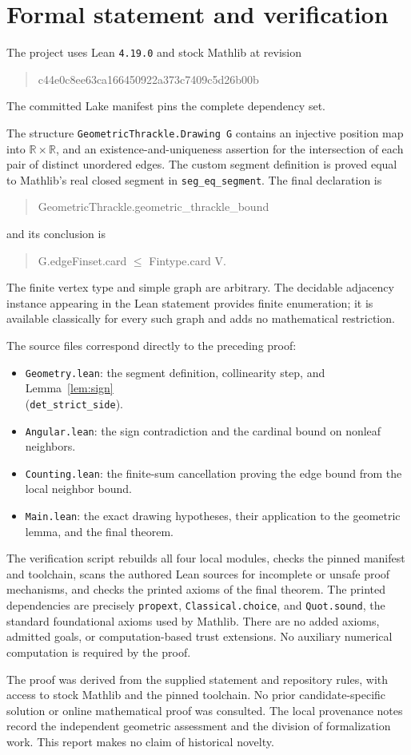 \documentclass[11pt]{article}
\begin{document}
\section{Formal statement and verification}
The project uses Lean \texttt{4.19.0} and stock Mathlib at revision
\begin{quote}\small\ttfamily
c44e0c8ee63ca166450922a373c7409c5d26b00b
\end{quote}
The committed Lake manifest pins the complete dependency set.

The structure \texttt{GeometricThrackle.Drawing G} contains an injective
position map into $\mathbb R\times\mathbb R$, and an existence-and-uniqueness
assertion for the intersection of each pair of distinct unordered edges.
The custom segment definition is proved equal to Mathlib's real closed
segment in \texttt{seg\_eq\_segment}. The final declaration is
\begin{quote}\ttfamily\small
GeometricThrackle.geometric\_thrackle\_bound
\end{quote}
and its conclusion is
\begin{quote}\ttfamily\small
G.edgeFinset.card $\leq$ Fintype.card V.
\end{quote}
The finite vertex type and simple graph are arbitrary. The decidable
adjacency instance appearing in the Lean statement provides finite
enumeration; it is available classically for every such graph and adds
no mathematical restriction.

The source files correspond directly to the preceding proof:
\begin{itemize}
\item \texttt{Geometry.lean}: the segment definition, collinearity step,
      and Lemma~\ref{lem:sign}\\
      (\texttt{det\_strict\_side}).
\item \texttt{Angular.lean}: the sign contradiction and the cardinal
      bound on nonleaf neighbors.
\item \texttt{Counting.lean}: the finite-sum cancellation proving the
      edge bound from the local neighbor bound.
\item \texttt{Main.lean}: the exact drawing hypotheses, their application
      to the geometric lemma, and the final theorem.
\end{itemize}
The verification script rebuilds all four local modules, checks the
pinned manifest and toolchain, scans the authored Lean sources for
incomplete or unsafe proof mechanisms, and checks the printed axioms of
the final theorem. The printed dependencies are precisely
\texttt{propext}, \texttt{Classical.choice}, and \texttt{Quot.sound}, the
standard foundational axioms used by Mathlib. There are no added axioms,
admitted goals, or computation-based trust extensions. No auxiliary
numerical computation is required by the proof.

The proof was derived from the supplied statement and repository rules,
with access to stock Mathlib and the pinned toolchain. No prior
candidate-specific solution or online mathematical proof was consulted.
The local provenance notes record the independent geometric assessment
and the division of formalization work. This report makes no claim of
historical novelty.
\end{document}
